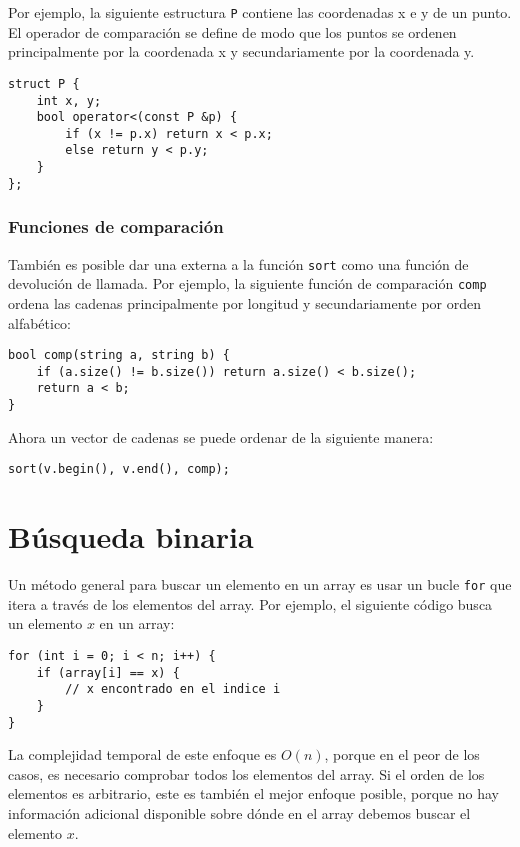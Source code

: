Por ejemplo, la siguiente estructura \texttt{P}
contiene las coordenadas x e y de un punto.
El operador de comparación se define de modo que
los puntos se ordenen principalmente por la coordenada x
y secundariamente por la coordenada y.

\begin{lstlisting}
struct P {
    int x, y;
    bool operator<(const P &p) {
        if (x != p.x) return x < p.x;
        else return y < p.y;
    }
};
\end{lstlisting}

\subsubsection{Funciones de comparación}


También es posible dar una externa
 a la función \texttt{sort}
como una función de devolución de llamada.
Por ejemplo, la siguiente función de comparación \texttt{comp}
ordena las cadenas principalmente por longitud y secundariamente
por orden alfabético:

\begin{lstlisting}
bool comp(string a, string b) {
    if (a.size() != b.size()) return a.size() < b.size();
    return a < b;
}
\end{lstlisting}
Ahora un vector de cadenas se puede ordenar de la siguiente manera:
\begin{lstlisting}
sort(v.begin(), v.end(), comp);
\end{lstlisting}

\section{Búsqueda binaria}


Un método general para buscar un elemento
en un array es usar un bucle \texttt{for}
que itera a través de los elementos del array.
Por ejemplo, el siguiente código busca
un elemento $x$ en un array:

\begin{lstlisting}
for (int i = 0; i < n; i++) {
    if (array[i] == x) {
        // x encontrado en el indice i
    }
}
\end{lstlisting}

La complejidad temporal de este enfoque es $O(n)$,
porque en el peor de los casos, es necesario comprobar
todos los elementos del array.
Si el orden de los elementos es arbitrario,
este es también el mejor enfoque posible, porque
no hay información adicional disponible sobre dónde
en el array debemos buscar el elemento $x$.

